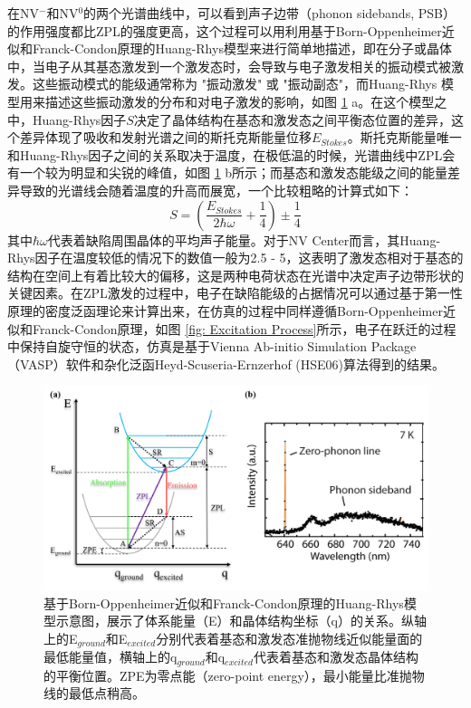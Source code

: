 \documentclass[type = bachelor]{whu-thesis}
\begin{document}
在NV$^-$和NV$^0$的两个光谱曲线中，可以看到声子边带（phonon sidebands, PSB）的作用强度都比ZPL的强度更高，这个过程可以用利用基于Born-Oppenheimer近似和Franck-Condon原理的Huang-Rhys模型来进行简单地描述，即在分子或晶体中，当电子从其基态激发到一个激发态时，会导致与电子激发相关的振动模式被激发。这些振动模式的能级通常称为 "振动激发" 或 "振动副态"，而Huang-Rhys 模型用来描述这些振动激发的分布和对电子激发的影响，如图 \ref{fig: Franck-Condon} a\cite{zou2023influence}。在这个模型之中，Huang-Rhys因子$S$决定了晶体结构在基态和激发态之间平衡态位置的差异，这个差异体现了吸收和发射光谱之间的斯托克斯能量位移$E_{Stokes}$。斯托克斯能量唯一和Huang-Rhys因子之间的关系取决于温度，在极低温的时候，光谱曲线中ZPL会有一个较为明显和尖锐的峰值，如图 \ref{fig: Franck-Condon} b所示；而基态和激发态能级之间的能量差异导致的光谱线会随着温度的升高而展宽，一个比较粗略的计算式如下： 
\begin{equation}
  S = (\frac{E_{Stokes}}{2\hbar \omega}+\frac{1}{4})±\frac{1}{4}
\end{equation}
其中$\hbar \omega$代表着缺陷周围晶体的平均声子能量\cite{de2015resolving}。对于NV Center而言，其Huang-Rhys因子在温度较低的情况下的数值一般为2.5 - 5，这表明了激发态相对于基态的结构在空间上有着比较大的偏移，这是两种电荷状态在光谱中决定声子边带形状的关键因素。在ZPL激发的过程中，电子在缺陷能级的占据情况可以通过基于第一性原理的密度泛函理论来计算出来，在仿真的过程中同样遵循Born-Oppenheimer近似和Franck-Condon原理，如图 \ref{fig: Excitation Process}所示，电子在跃迁的过程中保持自旋守恒的状态，仿真是基于Vienna Ab-initio Simulation Package（VASP）软件和杂化泛函Heyd-Scuseria-Ernzerhof (HSE06)算法得到的结果\cite{zou2023influence}。


\begin{figure}
  \centering
  \includegraphics[width=1.0\textwidth]{figures/Chapter 2/Franck-Condon.png}
  \caption[基于Born-Oppenheimer近似和Franck-Condon原理的Huang-Rhys模型示意图]{基于Born-Oppenheimer近似和Franck-Condon原理的Huang-Rhys模型示意图，展示了体系能量（E）和晶体结构坐标（q）的关系。纵轴上的E$_{ground}$和E$_{excited}$分别代表着基态和激发态准抛物线近似能量面的最低能量值，横轴上的q$_{ground}$和q$_{excited}$代表着基态和激发态晶体结构的平衡位置。ZPE为零点能（zero-point energy），最小能量比准抛物线的最低点稍高。}
  \label{fig: Franck-Condon}
\end{figure}
\end{document}
